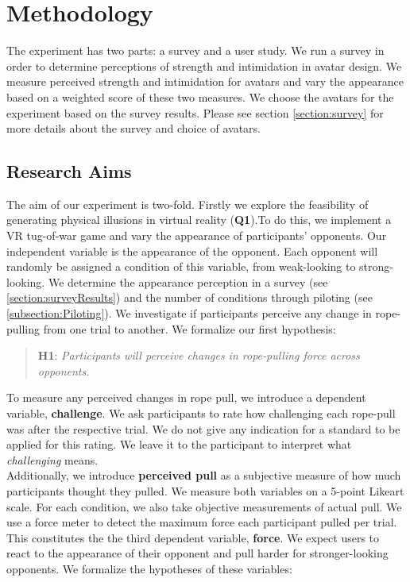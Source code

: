 
\section{Methodology}
\label{section:methodology}
The experiment has two parts: a survey and a user study. We run a survey in order to determine perceptions of strength and intimidation in avatar design. We measure perceived strength and intimidation for avatars and vary the appearance based on a weighted score of these two measures. We choose the avatars for the experiment based on the survey results. Please see section \ref{section:survey} for more details about the survey and choice of avatars.
\subsection{Research Aims}
The aim of our experiment is two-fold. Firstly we explore the feasibility of generating physical illusions in virtual reality (\textbf{Q1}).To do this, we implement a VR tug-of-war game and vary the appearance of participants' opponents. Our independent variable is the appearance of the opponent. Each opponent will randomly be assigned a condition of this variable, from weak-looking to strong-looking. We determine the appearance perception in a survey (see \ref{section:surveyResults}) and the number of conditions through piloting (see \ref{subsection:Piloting}).  We investigate if participants perceive any change in rope-pulling from one trial to another. We formalize our first hypothesis:
\begin{quote}
\textbf{H1}: \textit{Participants will perceive changes in rope-pulling force across opponents.}
\end{quote}
To measure any perceived changes in rope pull, we introduce a dependent variable, \textbf{challenge}. We ask participants to rate how challenging each rope-pull was after the respective trial. We do not give any indication for a standard to be applied for this rating. We leave it to the participant to interpret what \textit{challenging} means.\\ Additionally, we introduce \textbf{perceived pull} as a subjective measure of how much participants thought they pulled. We measure both variables on a 5-point Likeart scale. For each condition, we also take objective measurements of actual pull. We use a force meter to detect the maximum force each participant pulled per trial. This constitutes the the third dependent variable, \textbf{force}. We expect users to react to the appearance of their opponent and pull harder for stronger-looking opponents. We formalize the hypotheses of these variables:\\

